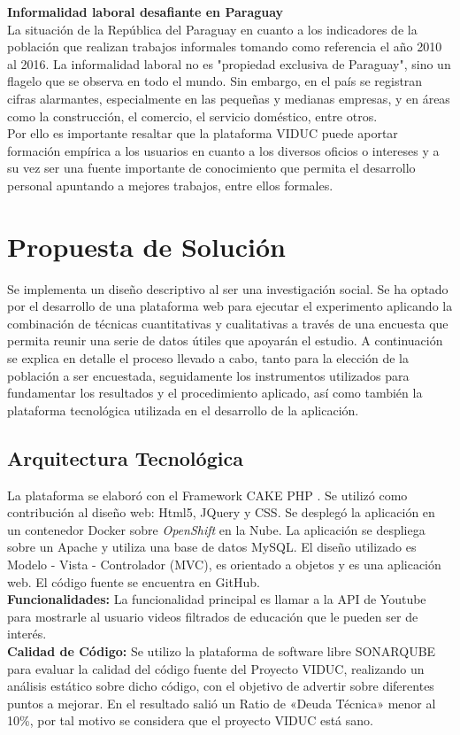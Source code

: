\documentclass[runningheads]{llncs}
\begin{document}
\textbf{Informalidad laboral desafiante en Paraguay}\\
La situación de la República del Paraguay en cuanto a los indicadores de la población que realizan trabajos informales tomando como referencia el año 2010 al 2016. La informalidad laboral no es "propiedad exclusiva de Paraguay", sino un flagelo que se observa en todo el mundo. Sin embargo, en el país se registran cifras alarmantes, especialmente en las pequeñas y medianas empresas, y en áreas como la construcción, el comercio, el servicio doméstico, entre otros.\cite{12}\\
Por ello es importante resaltar que la plataforma VIDUC puede aportar formación empírica a los usuarios en cuanto a los diversos oficios o intereses y a su vez ser una fuente importante de conocimiento que permita el desarrollo personal apuntando a mejores trabajos, entre ellos formales.

\section{Propuesta de Solución}
Se implementa un diseño descriptivo al ser una investigación social. Se ha optado por el desarrollo de una plataforma web para ejecutar el experimento aplicando la combinación de técnicas cuantitativas y cualitativas a través de una encuesta que permita reunir una serie de datos útiles que apoyarán el estudio. 
A continuación se explica en detalle el proceso llevado a cabo, tanto para la elección de la población a ser encuestada, seguidamente los instrumentos utilizados para fundamentar los resultados y el procedimiento aplicado, así como también la plataforma tecnológica utilizada en el desarrollo de la aplicación.

\subsection{Arquitectura Tecnológica}
La plataforma se elaboró con el Framework CAKE PHP \cite{15}. Se utilizó como contribución al diseño web: Html5, JQuery y CSS. Se desplegó la aplicación en un contenedor Docker \cite{17} sobre \textit{OpenShift} \cite{18} en la Nube. La aplicación se despliega sobre un Apache\cite{19} y utiliza una base de datos MySQL\cite{20}. El diseño utilizado es Modelo - Vista - Controlador (MVC), es orientado a objetos y es una aplicación web. El código fuente se encuentra en GitHub.\cite{22}\\
\textbf{Funcionalidades: }La funcionalidad principal es llamar a la API de Youtube\cite{21} para mostrarle al usuario videos filtrados de educación que le pueden ser de interés.\\
\textbf{Calidad de Código: }Se utilizo la plataforma de software libre SONARQUBE \cite{13} para evaluar la calidad del código fuente del Proyecto VIDUC, realizando un análisis estático sobre dicho código, con el objetivo de advertir sobre diferentes puntos a mejorar. En el resultado salió un Ratio de «Deuda Técnica» menor al 10\%, por tal motivo se considera que el proyecto VIDUC está sano.
\end{document}
